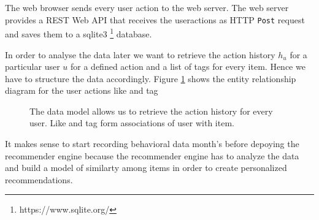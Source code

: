 The web browser sends every user action to the web server. The web server provides a REST Web API that receives the \glspl{useraction} as HTTP \verb|Post| request and saves them to a sqlite3 \footnote{https://www.sqlite.org/} database.

In order to analyse the data later we want to retrieve the action history $h_u$ for a particular user $u$ for a defined action and a list of tags for every item. Hence we have to structure the data accordingly. Figure \ref{fig:er} shows the entity relationship diagram for the user actions \gls{like} and \gls{tag}


\begin{figure}
\centering
{}
\caption{The data model allows us to retrieve the action history for every user. Like and tag form associations of user with item.}
\label{fig:er}
\end{figure}

It makes sense to start recording behavioral data month's before depoying the recommender engine because the recommender engine has to analyze the data and build a model of similarty among items in order to create personalized recommendations.

